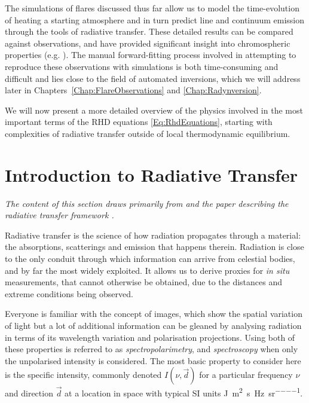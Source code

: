 The simulations of flares discussed thus far allow us to model the time-evolution of heating a starting atmosphere and in turn predict line and continuum emission through the tools of radiative transfer.
These detailed results can be compared against observations, and have provided significant insight into chromospheric properties (e.g. \citet{Kuridze2015,RubioDaCosta2016,Kowalski2017,Simoes2017}).
The manual forward-fitting process involved in attempting to reproduce these observations with simulations is both time-consuming and difficult and lies close to the field of automated inversions, which we will address later in Chapters~\ref{Chap:FlareObservations} and \ref{Chap:Radynversion}.

We will now present a more detailed overview of the physics involved in the most important terms of the RHD equations \eqref{Eq:RhdEquations}, starting with complexities of radiative transfer outside of local thermodynamic equilibrium.

\section{Introduction to Radiative Transfer}\label{Sec:IntroRT}

\emph{The content of this section draws primarily from \citet{Hubeny2014} and the paper describing the \Lw{} radiative transfer framework \citep{Osborne2021}.}

Radiative transfer is the science of how radiation propagates through a material: the absorptions, scatterings and emission that happens therein.
Radiation is close to the only conduit through which information can arrive from celestial bodies, and by far the most widely exploited.
It allows us to derive proxies for \emph{in situ} measurements, that cannot otherwise be obtained, due to the distances and extreme conditions being observed.

Everyone is familiar with the concept of images, which show the spatial variation of light but a lot of additional information can be gleaned by analysing radiation in terms of its wavelength variation and polarisation projections.
Using both of these properties is referred to as \emph{spectropolarimetry}, and \emph{spectroscopy} when only the unpolarised intensity is considered.
The most basic property to consider here is the specific intensity, commonly denoted $I(\nu, \vec{d})$ for a particular frequency $\nu$ and direction $\vec{d}$ at a location in space with typical SI units \si{\joule\per\square\metre\per\s\per\hertz\per\steradian}.

